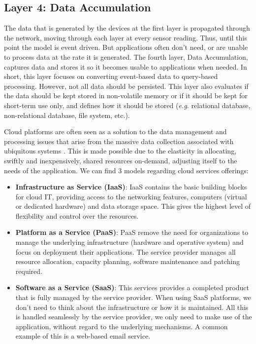 \subsection{Layer 4: Data Accumulation}
\label{sec:iot-model-layer4}

The data that is generated by the devices at the first layer is propagated through the network, moving through each layer at every sensor reading. Thus, until this point the model is event driven. 
But applications often don't need, or are unable to process data at the rate it is generated. The fourth layer, Data Accumulation, captures data and stores it so it becomes usable to applications when needed. In short, this layer focuses on converting event-based data to query-based processing. However, not all data should be persisted. This layer also evaluates if the data should be kept stored in non-volatile memory or if it should be kept for short-term use only, and defines how it should be stored (\textit{e.g.} relational database, non-relational database, file system, etc.).

Cloud platforms are often seen as a solution to the data management and processing issues that arise from the massive data collection associated with ubiquitous systems \cite{Baker2017}. This is made possible due to the elasticity in allocating, swiftly and inexpensively, shared resources on-demand, adjusting itself to the needs of the application. We can find 3 models regarding cloud services offerings:

\begin{itemize}
    \item \textbf{Infrastructure as Service (IaaS)}: IaaS contains the basic building blocks for cloud IT, providing access to the networking features, computers (virtual or dedicated hardware) and data storage space. This gives the highest level of flexibility and control over the resources.
    \item \textbf{Platform as a Service (PaaS)}: PaaS remove the need for organizations to manage the underlying infrastructure (hardware and operative system) and focus on deployment their applications. The service provider manages all resource allocation, capacity planning, software maintenance and patching required.
    \item \textbf{Software as a Service (SaaS)}: This services provides a completed product that is fully managed by the service provider. When using SaaS platforms, we don't need to think about the infrastructure or how it is maintained. All this is handled seamlessly by the service provider, we only need to make use of the application, without regard to the underlying mechanisms. A common example of this is a web-based email service. 
\end{itemize}

